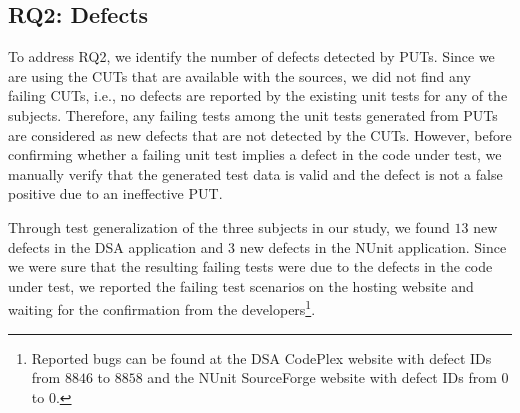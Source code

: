 \subsection{RQ2: Defects}

To address RQ2, we identify the number of defects detected by PUTs. Since we are using the CUTs that are available with the sources, we did not find any failing CUTs, i.e., no defects are reported by the existing unit tests for any of the subjects. Therefore, any failing tests among the unit tests generated from PUTs are considered as new defects that are not detected by the CUTs. However, before confirming whether a failing unit test implies a defect in the code under test, we manually verify that the generated test data is valid and the defect is not a false positive due to an ineffective PUT. 

Through test generalization of the three subjects in our study, we found $13$ new defects in the DSA application and $3$ new defects in the NUnit application. Since we were sure that the resulting failing tests were due to the defects in the code under test, we reported the failing test scenarios on the hosting website and waiting for the confirmation from the developers\footnote{Reported bugs can be found at the DSA CodePlex website with defect IDs from $8846$ to $8858$ and the NUnit SourceForge website with defect IDs from $0$ to $0$.}.

